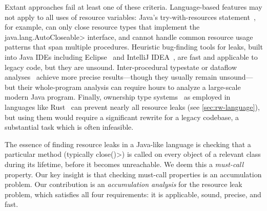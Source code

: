 \noindent
Extant approaches fail at least one of these criteria.
Language-based features may not apply to all uses of resource variables:
Java's try-with-resources statement~\cite{try-with-resources}, for example, can
only close resource types that implement the \<java.lang.AutoCloseable> interface,
and cannot handle
common resource usage patterns that span multiple procedures. 
Heuristic bug-finding tools for leaks, built into Java IDEs including
Eclipse~\cite{ecj-resource-leak} and IntelliJ
IDEA~\cite{idea-resource-leak}, 
are fast and applicable to legacy
code, but they are unsound.
Inter-procedural typestate or dataflow analyses~\cite{TorlakC10,zuo2019grapple}
achieve more precise
results---though they usually remain unsound---but
their whole-program analysis can require hours to analyze a large-scale modern Java program.
Finally, ownership type
systems~\cite{clarke2013ownership} as employed in languages like
Rust~\cite{klabnik2018rust} can prevent nearly all resource leaks (see
\cref{sec:rw-language}), but using them would require a significant rewrite for
a legacy codebase, a substantial task which is often infeasible.

The essence of finding resource leaks in a Java-like language is
checking that a particular method (typically \<close()>) is called on
every object of a relevant class during its lifetime, before it
becomes unreachable.  We deem this a \emph{must-call} property.
Our
key insight is that checking must-call properties is an
accumulation problem.
Our contribution is an \emph{accumulation analysis} for the resource leak
problem, which satisfies all four requirements:  it is applicable,
sound, precise, and fast.

